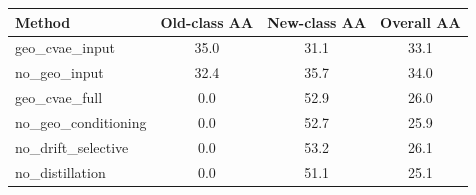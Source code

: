 \begin{tabular}{lccc}
\toprule
\textbf{Method} & \textbf{Old-class AA} & \textbf{New-class AA} & \textbf{Overall AA} \\
\midrule
geo_cvae_input & 35.0 & 31.1 & 33.1 \\
no_geo_input & 32.4 & 35.7 & 34.0 \\
geo_cvae_full & 0.0 & 52.9 & 26.0 \\
no_geo_conditioning & 0.0 & 52.7 & 25.9 \\
no_drift_selective & 0.0 & 53.2 & 26.1 \\
no_distillation & 0.0 & 51.1 & 25.1 \\
\bottomrule
\end{tabular}